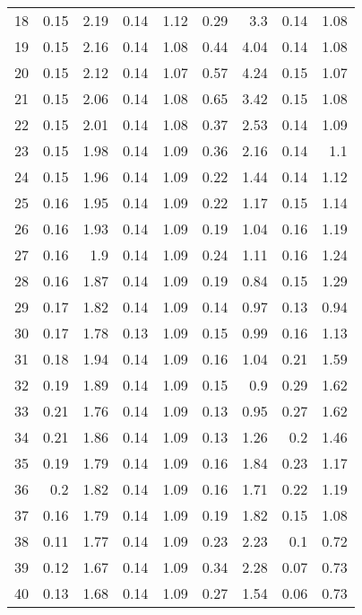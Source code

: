 \begin{table}[h]
\begin{tabular}{crrrrrrrr}
		18&0.15&2.19&0.14&1.12&0.29&3.3&0.14&1.08\\
		19&0.15&2.16&0.14&1.08&0.44&4.04&0.14&1.08\\
		20&0.15&2.12&0.14&1.07&0.57&4.24&0.15&1.07\\
		21&0.15&2.06&0.14&1.08&0.65&3.42&0.15&1.08\\
		22&0.15&2.01&0.14&1.08&0.37&2.53&0.14&1.09\\
		23&0.15&1.98&0.14&1.09&0.36&2.16&0.14&1.1\\
		24&0.15&1.96&0.14&1.09&0.22&1.44&0.14&1.12\\
		25&0.16&1.95&0.14&1.09&0.22&1.17&0.15&1.14\\
		26&0.16&1.93&0.14&1.09&0.19&1.04&0.16&1.19\\
		27&0.16&1.9&0.14&1.09&0.24&1.11&0.16&1.24\\
		28&0.16&1.87&0.14&1.09&0.19&0.84&0.15&1.29\\
		29&0.17&1.82&0.14&1.09&0.14&0.97&0.13&0.94\\
		30&0.17&1.78&0.13&1.09&0.15&0.99&0.16&1.13\\
		31&0.18&1.94&0.14&1.09&0.16&1.04&0.21&1.59\\
		32&0.19&1.89&0.14&1.09&0.15&0.9&0.29&1.62\\
		33&0.21&1.76&0.14&1.09&0.13&0.95&0.27&1.62\\
		34&0.21&1.86&0.14&1.09&0.13&1.26&0.2&1.46\\
	35&0.19&1.79&0.14&1.09&0.16&1.84&0.23&1.17\\
	36&0.2&1.82&0.14&1.09&0.16&1.71&0.22&1.19\\
	37&0.16&1.79&0.14&1.09&0.19&1.82&0.15&1.08\\
	38&0.11&1.77&0.14&1.09&0.23&2.23&0.1&0.72\\
	39&0.12&1.67&0.14&1.09&0.34&2.28&0.07&0.73\\
	40&0.13&1.68&0.14&1.09&0.27&1.54&0.06&0.73\\
		\bottomrule
	\end{tabular}
	\label{table:completeMomentError}
\end{table}
